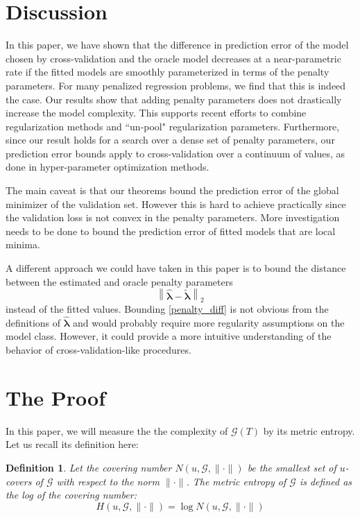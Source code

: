 \documentclass[12pt]{article}
\newtheorem{definition}{Definition}
\begin{document}
\section{Discussion}\label{sec:discussion}

In this paper, we have shown that the difference in prediction error of the model chosen by cross-validation and the oracle model decreases at a near-parametric rate if the fitted models are smoothly parameterized in terms of the penalty parameters. For many penalized regression problems, we find that this is indeed the case. Our results show that adding penalty parameters does not drastically increase the model complexity. This supports recent efforts to combine regularization methods and ``un-pool" regularization parameters. Furthermore, since our result holds for a search over a dense set of penalty parameters, our prediction error bounds apply to cross-validation over a continuum of values, as done in hyper-parameter optimization methods.

The main caveat is that our theorems bound the prediction error of the global minimizer of the validation set. However this is hard to achieve practically since the validation loss is not convex in the penalty parameters. More investigation needs to be done to bound the prediction error of fitted models that are local minima.

A different approach we could have taken in this paper is to bound the distance between the estimated and oracle penalty parameters
\begin{equation}
\label{penalty_diff}
\left \| \hat{\boldsymbol \lambda} - \tilde{\boldsymbol \lambda} \right \|_2
\end{equation}
instead of the fitted values. Bounding \ref{penalty_diff} is not obvious from the definitions of $\hat{\boldsymbol{\lambda}}$ and would probably require more regularity assumptions on the model class. However, it could provide a more intuitive understanding of the behavior of cross-validation-like procedures.

\section{The Proof} \label{sec:proofs}

In this paper, we will measure the the complexity of $\mathcal{G}(T)$ by its metric entropy. Let us recall its definition here:

\begin{definition}
Let the covering number $N(u, \mathcal{G}, \| \cdot \|)$ be the smallest set of $u$-covers of $\mathcal{G}$ with respect to the norm $\| \cdot \|$. The metric entropy of $\mathcal{G}$ is defined as the log of the covering number:
\begin{equation}
H (u, \mathcal{G}, \| \cdot \| ) = \log N(u, \mathcal{G}, \| \cdot \|)
\end{equation}
\end{definition}
\end{document}
